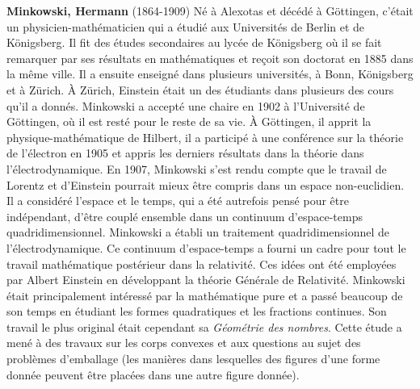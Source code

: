 \textbf{Minkowski, Hermann} (1864-1909) Né à Alexotas et décédé à Göttingen, c'était un physicien-mathématicien qui a étudié aux Universités de Berlin et de Königsberg. Il fit des études secondaires au lycée de Königsberg où il se fait remarquer par ses résultats en mathématiques et reçoit son doctorat en 1885 dans la même ville. Il a ensuite enseigné dans plusieurs universités, à Bonn, Königsberg et à Zürich. À Zürich, Einstein était un des étudiants dans plusieurs des cours qu'il a donnés. Minkowski a accepté une chaire en 1902 à l'Université de Göttingen, où il est resté pour le reste de sa vie. À Göttingen, il apprit la physique-mathématique de Hilbert, il a participé à une conférence sur la théorie de l'électron en 1905 et appris les derniers résultats dans la théorie dans l'électrodynamique. En 1907, Minkowski s'est rendu compte que le travail de Lorentz et d'Einstein pourrait mieux être compris dans un espace non-euclidien. Il a considéré l'espace et le temps, qui a été autrefois pensé pour être indépendant, d'être couplé ensemble dans un continuum d'espace-temps quadridimensionnel. Minkowski a établi un traitement quadridimensionnel de l'électrodynamique. Ce continuum d'espace-temps a fourni un cadre pour tout le travail mathématique postérieur dans la relativité. Ces idées ont été employées par Albert Einstein en développant la théorie Générale de Relativité. Minkowski était principalement intéressé par la mathématique pure et a passé beaucoup de son temps en étudiant les formes quadratiques et les fractions continues. Son travail le plus original était cependant sa \textit{Géométrie des nombres}. Cette étude a mené à des travaux sur les corps convexes et aux questions au sujet des problèmes d'emballage (les manières dans lesquelles des figures d'une forme donnée peuvent être placées dans une autre figure donnée).

